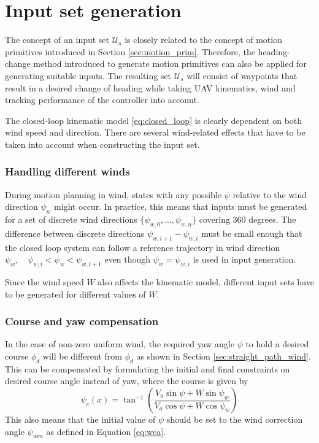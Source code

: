 \section{Input set generation}\label{sec:motion_prims_wind}
The concept of an input set $\mathcal{U}_s$ is closely related to the concept of motion primitives introduced in Section \ref{sec:motion_prim}. Therefore, 
the heading-change method introduced to generate motion primitives can also be applied for generating suitable inputs. The resulting set $\mathcal{U}_s$ will consist
of waypoints that result in a desired change of heading while taking UAV kinematics, wind and tracking performance of the controller into account.

The closed-loop kinematic model \eqref{eq:closed_loop} is clearly dependent on both wind speed and direction. There are several 
wind-related effects that have to be taken into account when constructing the input set.
\subsubsection{Handling different winds}
During motion planning in wind, states with any possible $\psi$ relative to the wind direction $\psi_w$ might occur. 
In practice, this means that inputs must be generated for a set of discrete wind directions $\{\psi_{w,0},\hdots,\psi_{w,n}\}$ covering 360 degrees. 
The difference between discrete directions $\psi_{w,i+1}-\psi_{w,i}$ must be small enough that the closed loop system can follow a reference trajectory in wind 
direction $\psi_w,\quad\psi_{w,i}<\psi_w<\psi_{w,i+1}$ even though $\psi_w=\psi_{w,i}$ is used in input generation.

Since the wind speed $W$ also affects the kinematic model, different input sets have to be generated for different values of $W$.
\subsubsection{Course and yaw compensation}
In the case of non-zero uniform wind, the required yaw angle $\psi$ to hold a desired 
course $\phi_d$ will be different from $\phi_d$ as shown in Section \ref{sec:straight_path_wind}. This can be compensated by 
formulating the initial and final constraints on desired course angle instead of yaw, where the course is given by 
\begin{equation}
    \psi_c(x) = \tan^{-1}\left(\frac{V_a\sin\psi + W\sin\psi_w}{V_a\cos\psi+W\cos\psi_w}\right)
\end{equation}
This also means that the initial value of $\psi$ should be set to the wind correction angle $\psi_{wca}$ as defined in Equation \eqref{eq:wca}.
